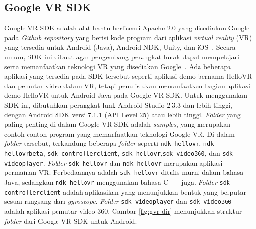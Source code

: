 \subsection{Google VR SDK}
Google VR SDK adalah alat bantu berlisensi Apache 2.0 yang disediakan Google pada \textit{Github repository} yang berisi kode program dari aplikasi {\it virtual reality} (VR)  yang tersedia untuk Android (Java), Android NDK, Unity, dan iOS~\cite{gvr-sdk-repo}. Secara umum, SDK ini dibuat agar pengembang perangkat lunak dapat mempelajari serta memanfaatkan teknologi VR yang disediakan Google~\cite{quickstart-google-vr}. Ada beberapa aplikasi yang tersedia pada SDK tersebut seperti aplikasi demo bernama HelloVR dan pemutar video dalam VR, tetapi penulis akan memanfaatkan bagian aplikasi demo HelloVR untuk Android Java pada Google VR SDK. Untuk menggunakan SDK ini, dibutuhkan perangkat lunk Android Studio 2.3.3 dan lebih tinggi, dengan Android SDK versi 7.1.1 (API Level 25) atau lebih tinggi. \textit{Folder} yang paling penting di dalam Google VR SDK adalah \textit{samples}, yang merupakan contoh-contoh program yang memanfaatkan teknologi Google VR. Di dalam \textit{folder} tersebut, terkandung beberapa \textit{folder} seperti \texttt{ndk-hellovr}, \texttt{ndk-hellovrbeta}, \texttt{sdk-controllerclient}, \texttt{sdk-hellovr},\texttt{sdk-video360}, dan \texttt{sdk-videoplayer}. \textit{Folder} \texttt{sdk-hellovr} dan \texttt{ndk-hellovr} merupakan aplikasi permainan VR. Perbedaannya adalah \texttt{sdk-hellovr} ditulis murni dalam bahasa Java, sedangkan \texttt{ndk-hellovr} menggunakan bahasa C++ juga.  \textit{Folder} \texttt{sdk-controllerclient} adalah aplikasikan yang menunjukkan bentuk yang berputar sesuai rangsang dari \textit{gyroscope}. \textit{Folder} \texttt{sdk-videoplayer} dan \texttt{sdk-video360} adalah aplikasi pemutar video 360. Gambar \ref{fig:gvr-dir} menunjukkan struktur \textit{folder} dari Google VR SDK untuk Android. 

